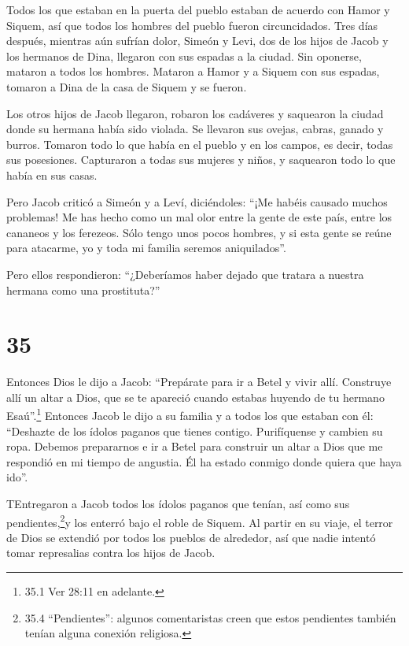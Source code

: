  Todos los que estaban en la puerta del pueblo estaban de
acuerdo con Hamor y Siquem, así que todos los hombres del pueblo fueron
circuncidados.  Tres días después, mientras aún sufrían
dolor, Simeón y Levi, dos de los hijos de Jacob y los hermanos de Dina,
llegaron con sus espadas a la ciudad. Sin oponerse, mataron a todos los
hombres.  Mataron a Hamor y a Siquem con sus espadas,
tomaron a Dina de la casa de Siquem y se fueron.

 Los otros hijos de Jacob llegaron, robaron los cadáveres y
saquearon la ciudad donde su hermana había sido violada. 
Se llevaron sus ovejas, cabras, ganado y burros. Tomaron todo lo que
había en el pueblo y en los campos,  es decir, todas sus
posesiones. Capturaron a todas sus mujeres y niños, y saquearon todo lo
que había en sus casas.

 Pero Jacob criticó a Simeón y a Leví, diciéndoles: ``¡Me
habéis causado muchos problemas! Me has hecho como un mal olor entre la
gente de este país, entre los cananeos y los ferezeos. Sólo tengo unos
pocos hombres, y si esta gente se reúne para atacarme, yo y toda mi
familia seremos aniquilados''.

 Pero ellos respondieron: ``¿Deberíamos haber dejado que
tratara a nuestra hermana como una prostituta?''

\hypertarget{section-34}{%
\section{35}\label{section-34}}

 Entonces Dios le dijo a Jacob: ``Prepárate para ir a Betel
y vivir allí. Construye allí un altar a Dios, que se te apareció cuando
estabas huyendo de tu hermano Esaú''.\footnote{35.1 Ver 28:11 en
  adelante.}  Entonces Jacob le dijo a su familia y a todos
los que estaban con él: ``Deshazte de los ídolos paganos que tienes
contigo. Purifíquense y cambien su ropa.  Debemos
prepararnos e ir a Betel para construir un altar a Dios que me respondió
en mi tiempo de angustia. Él ha estado conmigo donde quiera que haya
ido''.

 TEntregaron a Jacob todos los ídolos paganos que tenían,
así como sus pendientes,\footnote{35.4 ``Pendientes'': algunos
  comentaristas creen que estos pendientes también tenían alguna
  conexión religiosa.}y los enterró bajo el roble de Siquem.
 Al partir en su viaje, el terror de Dios se extendió por
todos los pueblos de alrededor, así que nadie intentó tomar represalias
contra los hijos de Jacob.

